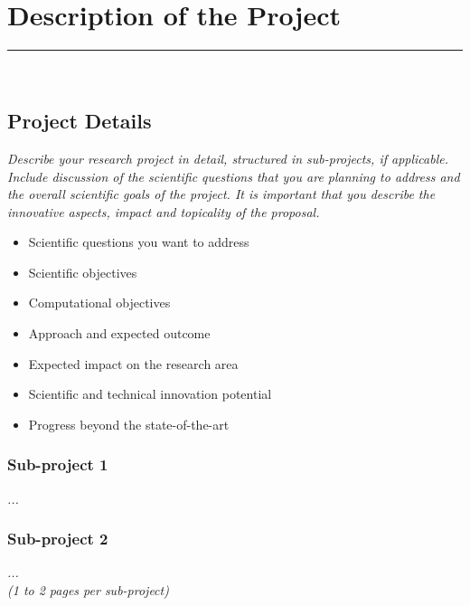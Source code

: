 \documentclass [a4paper, 12pt]{article}
\begin{document}
\section{Description of the Project}
\rule{\textwidth}{0.4pt}\\
\subsection{Project Details}
\textit{Describe your research project in detail, structured in sub-projects, if applicable. Include discussion of the scientific questions that you are planning to address and the overall scientific goals of the project. It is important that you describe the innovative aspects, impact and topicality of the proposal.}
\begin{itshape}
\begin{itemize}\setlength{\itemsep}{-2pt}
  \item Scientific questions you want to address
  \item Scientific objectives
  \item Computational objectives
  \item Approach and expected outcome
  \item Expected impact on the research area
  \item Scientific and technical innovation potential
  \item Progress beyond the state-of-the-art
\end{itemize}
\end{itshape}

\subsubsection{Sub-project 1}
\textit{...}

\subsubsection{Sub-project 2}
\textit{...}\\

\textit{(1 to 2 pages per sub-project)}
\end{document}

